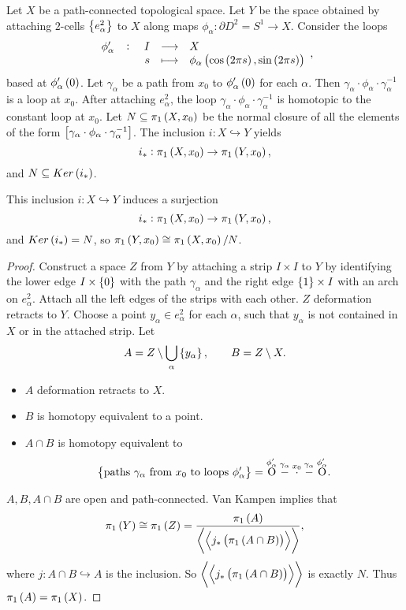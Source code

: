 Let $ X $ be a path-connected topological space. Let $ Y $ be the space obtained by attaching $ 2 $-cells $ \cbr{e_\alpha^2} $ to $ X $ along maps $ \phi_\alpha : \partial D^2 = S^1 \to X $. Consider the loops
$$ \function[\phi_\alpha']{I}{X}{s}{\phi_\alpha\br{\cos\br{2\pi s}, \sin\br{2\pi s}}}, $$
based at $ \phi_\alpha'\br{0} $. Let $ \gamma_\alpha $ be a path from $ x_0 $ to $ \phi_\alpha'\br{0} $ for each $ \alpha $. Then $ \gamma_\alpha \cdot \phi_\alpha \cdot \gamma_\alpha^{-1} $ is a loop at $ x_0 $. After attaching $ e_\alpha^2 $, the loop $ \gamma_\alpha \cdot \phi_\alpha \cdot \gamma_\alpha^{-1} $ is homotopic to the constant loop at $ x_0 $. Let $ N \subseteq \pi_1\br{X, x_0} $ be the normal closure of all the elements of the form $ \sbr{\gamma_\alpha \cdot \phi_\alpha \cdot \gamma_\alpha^{-1}} $. The inclusion $ i : X \hookrightarrow Y $ yields
$$ i_* : \pi_1\br{X, x_0} \to \pi_1\br{Y, x_0}, $$
and $ N \subseteq Ker\br{i_*} $.

\begin{proposition}
\label{prop:1.26}
This inclusion $ i : X \hookrightarrow Y $ induces a surjection
$$ i_* : \pi_1\br{X, x_0} \to \pi_1\br{Y, x_0}, $$
and $ Ker\br{i_*} = N $, so $ \pi_1\br{Y, x_0} \cong \pi_1\br{X, x_0} / N $.
\end{proposition}

\begin{proof}
Construct a space $ Z $ from $ Y $ by attaching a strip $ I \times I $ to $ Y $ by identifying the lower edge $ I \times \cbr{0} $ with the path $ \gamma_\alpha $ and the right edge $ \cbr{1} \times I $ with an arch on $ e_\alpha^2 $. Attach all the left edges of the strips with each other. $ Z $ deformation retracts to $ Y $. Choose a point $ y_\alpha \in e_\alpha^2 $ for each $ \alpha $, such that $ y_\alpha $ is not contained in $ X $ or in the attached strip. Let
$$ A = Z \setminus \bigcup_\alpha \cbr{y_\alpha}, \qquad B = Z \setminus X. $$
\begin{itemize}
\item $ A $ deformation retracts to $ X $.
\item $ B $ is homotopy equivalent to a point.
\item $ A \cap B $ is homotopy equivalent to
$$ \cbr{\text{paths} \ \gamma_\alpha \ \text{from} \ x_0 \ \text{to loops} \ \phi_\alpha'} = \overset{\phi_\alpha'}{\text{O}}\overset{\gamma_\alpha}{-}\overset{x_0}{\cdot}\overset{\gamma_\alpha}{-}\overset{\phi_\alpha'}{\text{O}}. $$
\end{itemize}
$ A, B, A \cap B $ are open and path-connected. Van Kampen implies that
$$ \pi_1\br{Y} \cong \pi_1\br{Z} = \dfrac{\pi_1\br{A}}{\abr{\abr{j_*\br{\pi_1\br{A \cap B}}}}}, $$
where $ j : A \cap B \hookrightarrow A $ is the inclusion. So $ \abr{\abr{j_*\br{\pi_1\br{A \cap B}}}} $ is exactly $ N $. Thus $ \pi_1\br{A} = \pi_1\br{X} $.
\end{proof}

